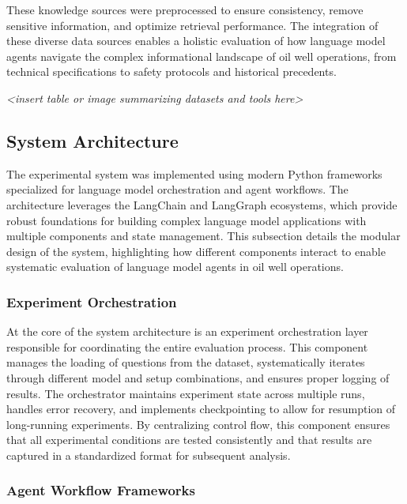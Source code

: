             These knowledge sources were preprocessed to ensure consistency, remove sensitive information, and optimize retrieval performance. The integration of these diverse data sources enables a holistic evaluation of how language model agents navigate the complex informational landscape of oil well operations, from technical specifications to safety protocols and historical precedents.

            \textit{<insert table or image summarizing datasets and tools here>}

        \subsection{System Architecture}

                The experimental system was implemented using modern Python frameworks specialized for language model orchestration and agent workflows. The architecture leverages the LangChain and LangGraph ecosystems, which provide robust foundations for building complex language model applications with multiple components and state management. This subsection details the modular design of the system, highlighting how different components interact to enable systematic evaluation of language model agents in oil well operations.

            \subsubsection{Experiment Orchestration}

                At the core of the system architecture is an experiment orchestration layer responsible for coordinating the entire evaluation process. This component manages the loading of questions from the dataset, systematically iterates through different model and setup combinations, and ensures proper logging of results. The orchestrator maintains experiment state across multiple runs, handles error recovery, and implements checkpointing to allow for resumption of long-running experiments. By centralizing control flow, this component ensures that all experimental conditions are tested consistently and that results are captured in a standardized format for subsequent analysis.

            \subsubsection{Agent Workflow Frameworks}

